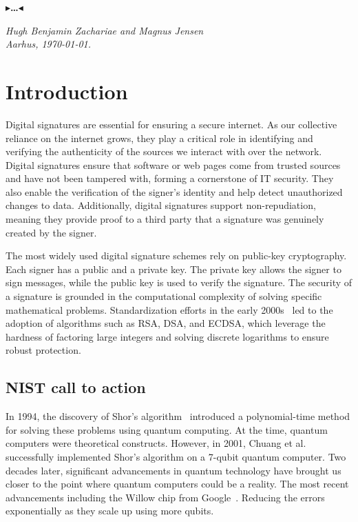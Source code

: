 \documentclass[11pt]{report}
\theoremstyle{definition}
\theoremstyle{plain}
\newcommand{\todo}[1]{{\color[rgb]{.5,0,0}\textbf{$\blacktriangleright$#1$\blacktriangleleft$}}}
\begin{document}
\todo{\dots}

\vspace{2ex}
\begin{flushright}
  \textit{Hugh Benjamin Zachariae and Magnus Jensen}\\
  \textit{Aarhus, \today.}
\end{flushright}

\tableofcontents
\cleardoublepage
{}
\setcounter{secnumdepth}{3}


\chapter{Introduction}\label{ch:intro}

Digital signatures are essential for ensuring a secure internet. As our collective reliance on the internet grows, they play a critical role in identifying and verifying the authenticity of the sources we interact with over the network. Digital signatures ensure that software or web pages come from trusted sources and have not been tampered with, forming a cornerstone of IT security. They also enable the verification of the signer's identity and help detect unauthorized changes to data. Additionally, digital signatures support non-repudiation, meaning they provide proof to a third party that a signature was genuinely created by the signer.

The most widely used digital signature schemes rely on public-key cryptography. Each signer has a public and a private key. The private key allows the signer to sign messages, while the public key is used to verify the signature. The security of a signature is grounded in the computational complexity of solving specific mathematical problems. Standardization efforts in the early 2000s~\cite{pub2000digital} led to the adoption of algorithms such as RSA, DSA, and ECDSA, which leverage the hardness of factoring large integers and solving discrete logarithms to ensure robust protection.

\section{NIST call to action}

In 1994, the discovery of Shor's algorithm~\cite{shor1997} introduced a polynomial-time method for solving these problems using quantum computing. At the time, quantum computers were theoretical constructs. However, in 2001, Chuang et al.~\cite{vandersypen2001experimental,buchmann2004post} successfully implemented Shor's algorithm on a 7-qubit quantum computer. Two decades later, significant advancements in quantum technology have brought us closer to the point where quantum computers could be a reality. The most recent advancements including the Willow chip from Google~\cite{blogMeetWillow}. Reducing the errors exponentially as they scale up using more qubits.
\end{document}
